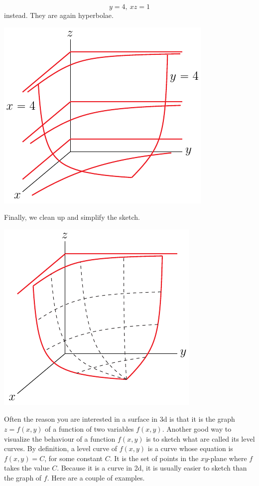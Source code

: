 \begin{eg}[$xyz=4$]
\begin{equation*}
y=4,\ xz=1
\end{equation*}
instead. They are again hyperbolae.
\begin{efig}
\begin{center}
   \includegraphics{seatC.pdf}
\end{center}
\end{efig}
Finally, we clean up and simplify the sketch.
\begin{efig}
\begin{center}
   \includegraphics{seatA.pdf}
\end{center}
\end{efig}

\end{eg}

Often the reason you are interested in a surface in 3d is that it is
the graph $z=f(x,y)$ of a function of two variables $f(x,y)$. Another good
way to visualize the behaviour of a function $f(x,y)$ is to sketch what
are called its level curves. By definition, a level curve of $f(x,y)$
is a curve whose equation is $f(x,y)=C$, for some constant $C$. It is the
set of points in the $xy$-plane where $f$ takes the value $C$. Because
it is a curve in 2d, it is usually easier to sketch than the graph of $f$.
Here are a couple of examples. 

